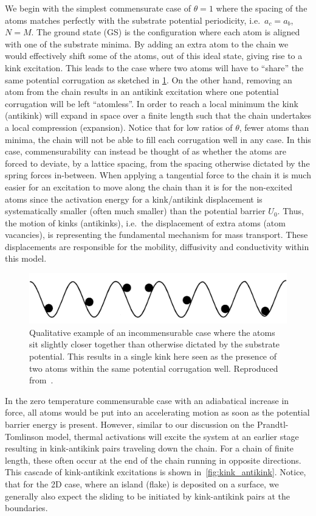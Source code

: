 We begin with the simplest commensurate case of $\theta = 1$ where the spacing
of the atoms matches perfectly with the substrate potential periodicity, i.e.\
$a_c = a_b$, $N = M$. The ground state (\acrshort{GS}) is the configuration
where each atom is aligned with one of the substrate minima. By adding an extra
atom to the chain we would effectively shift some of the atoms, out of this
ideal state, giving rise to a kink excitation. This leads to the case where two
atoms will have to ``share'' the same potential corrugation as sketched in
\cref{fig:incommensurable_example}. On the other hand, removing an atom from
the chain results in an antikink excitation where one potential corrugation will
be left ``atomless''. In order to reach a local minimum the kink (antikink) will
expand in space over a finite length such that the chain undertakes a local
compression (expansion). Notice that for low ratios of $\theta$, fewer atoms than minima, the chain will not be able to fill each corrugation well in any case. In this case, commensurability can instead be thought of as whether the atoms are forced to deviate, by a lattice spacing, from the spacing otherwise dictated by the spring forces in-between. When applying a tangential force to the chain it is much
easier for an excitation to move along the chain than it is for the non-excited
atoms since the activation energy for a kink/antikink
displacement is systematically smaller (often much smaller) than the potential
barrier $U_0$. Thus, the motion of kinks (antikinks), i.e.\ the displacement of
extra atoms (atom vacancies), is representing the fundamental mechanism for
mass transport. These displacements are responsible for the mobility,
diffusivity and conductivity within this model. 

\begin{figure}[!htb]
  \centering
  \includegraphics[width=0.55\linewidth]{figures/theory/incommensurable_example.png}
  \caption{Qualitative example of an incommensurable case where the atoms sit slightly closer together than otherwise dictated by the substrate potential. This results in a single kink here seen as the presence of two atoms within the same potential corrugation well. Reproduced from~\cite{BRAUN19981}.}
  \label{fig:incommensurable_example}
\end{figure}


In the zero temperature commensurable case with an adiabatical increase in force, all atoms would be put into an accelerating motion as soon as the potential barrier energy is present. However, similar to our discussion on the Prandtl-Tomlinson model, thermal activations will excite the system at an earlier stage resulting in kink-antikink pairs traveling down the chain. For a chain of finite length, these often occur at the end of the chain running in opposite directions. This cascade of kink-antikink excitations is shown in~\cref{fig:kink_antikink}. Notice, that for the 2D case, where an island (flake) is deposited on a surface, we generally also expect the sliding to be initiated by kink-antikink pairs at the boundaries. 


